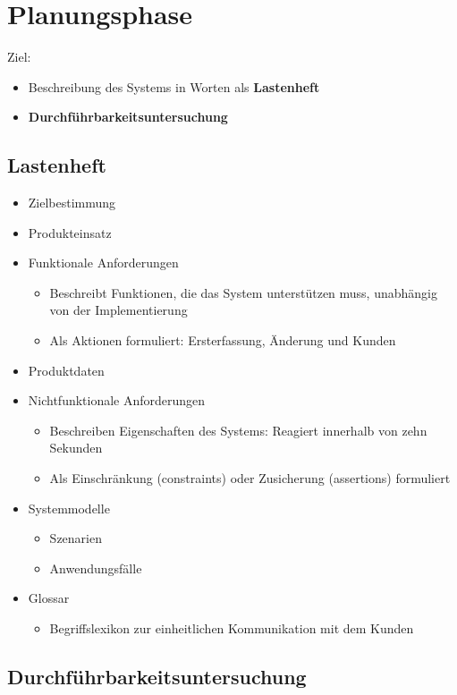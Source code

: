 \section{Planungsphase}

Ziel:
\begin{itemize}
\item Beschreibung des Systems in Worten als \textbf{Lastenheft}
\item \textbf{Durchführbarkeitsuntersuchung}
\end{itemize}
	
\subsection{Lastenheft}
	
\begin{itemize}
\item Zielbestimmung
\item Produkteinsatz
\item Funktionale Anforderungen
\begin{itemize}
\item Beschreibt Funktionen, die das System unterstützen muss, unabhängig von der Implementierung
\item Als Aktionen formuliert: \dq Ersterfassung, Änderung und Kunden\dq
\end{itemize}
\item Produktdaten
\item Nichtfunktionale Anforderungen
\begin{itemize}
\item Beschreiben Eigenschaften des Systems: \dq Reagiert innerhalb von zehn Sekunden\dq
\item Als Einschränkung (constraints) oder Zusicherung (assertions) formuliert
\end{itemize}
\item Systemmodelle
\begin{itemize}
\item Szenarien
\item Anwendungsfälle
\end{itemize}
\item Glossar
\begin{itemize}
\item Begriffslexikon zur einheitlichen Kommunikation mit dem Kunden
\end{itemize}
\end{itemize}
		
\subsection{Durchführbarkeitsuntersuchung}
			
